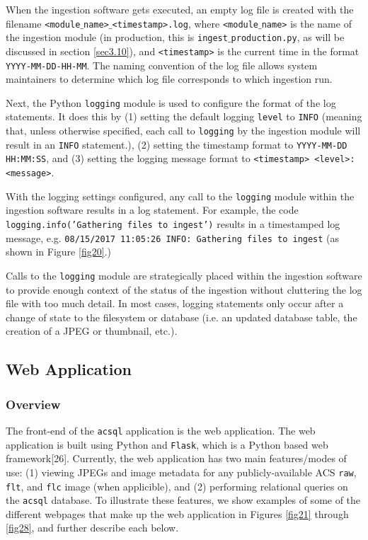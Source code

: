 \documentclass[10pt,journal,compsoc]{IEEEtran}
\begin{document}
When the ingestion software gets executed, an empty log file is created with the filename \texttt{<module$\_$name>$\_$<timestamp>.log}, where \texttt{<module$\_$name>} is the name of the
ingestion module (in production, this is \texttt{ingest$\_$production.py}, as will be discussed in section \ref{sec3.10}), and \texttt{<timestamp>} is the current time in the format
\texttt{YYYY-MM-DD-HH-MM}. The naming convention of the log file allows system maintainers to determine which log file corresponds to which ingestion run.

Next, the Python \texttt{logging} module is used to configure the format of the log statements.  It does this by (1) setting the default logging \texttt{level} to \texttt{INFO} (meaning
that, unless otherwise specified, each call to \texttt{logging} by the ingestion module will result in an \texttt{INFO} statement.), (2) setting the timestamp format to
\texttt{YYYY-MM-DD HH:MM:SS}, and (3) setting the logging message format to \texttt{<timestamp> <level>: <message>}.

With the logging settings configured, any call to the \texttt{logging} module within the ingestion software results in a log statement.  For example, the code
\texttt{logging.info('Gathering files to ingest')} results in a timestamped log message, e.g. \texttt{08/15/2017 11:05:26 INFO: Gathering files to ingest} (as shown in Figure \ref{fig20}.)

Calls to the \texttt{logging} module are strategically placed within the ingestion software to provide enough context of the status of the ingestion without cluttering the log file with
too much detail. In most cases, logging statements only occur after a change of state to the filesystem or database (i.e. an updated database table, the creation of a JPEG or thumbnail, etc.).


\subsection{Web Application} \label{sec3.9}


\subsubsection{Overview}

The front-end of the \texttt{acsql} application is the web application.  The web application is built using Python and \texttt{Flask}, which is a Python based web framework[26].
Currently, the web application has two main features/modes of use: (1) viewing JPEGs and image metadata for any publicly-available ACS \texttt{raw}, \texttt{flt}, and \texttt{flc} image
(when applicible), and (2) performing relational queries on the \texttt{acsql} database.  To illustrate these features, we show examples of some of the different webpages that make up the
web application in Figures \ref{fig21} through \ref{fig28}, and further describe each below.
\end{document}
